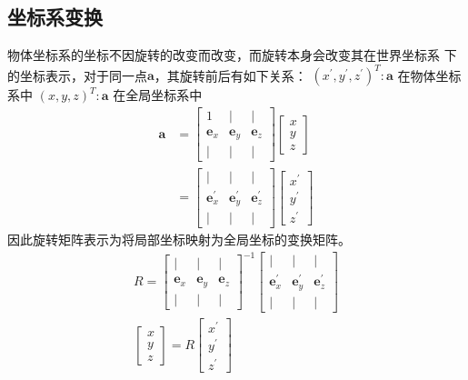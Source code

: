 \documentclass[lang=cn,newtx,10pt,scheme=chinese]{elegantbook}
\begin{document}
\subsection{坐标系变换}
物体坐标系的坐标不因旋转的改变而改变，而旋转本身会改变其在世界坐标系
下的坐标表示，对于同一点$\boldsymbol{a}$，其旋转前后有如下关系：
$\left(x^{\prime}, y^{\prime}, z^{\prime}\right)^T: 
\boldsymbol{a}$ 在物体坐标系中 $(x, y, z)^T: 
\boldsymbol{a}$ 在全局坐标系中
$$
\begin{aligned}
\boldsymbol{a} & =\left[\begin{array}{ccc}
1 & \mid & \mid \\
\boldsymbol{e}_x & \boldsymbol{e}_y & \boldsymbol{e}_z \\
\mid & \mid & \mid
\end{array}\right]\left[\begin{array}{l}
x \\
y \\
z
\end{array}\right] \\
& =\left[\begin{array}{ccc}
\mid & \mid & \mid \\
\boldsymbol{e}_x^{\prime} & \boldsymbol{e}_y^{\prime} & \boldsymbol{e}_z^{\prime} \\
\mid & \mid & \mid
\end{array}\right]\left[\begin{array}{l}
x^{\prime} \\
y^{\prime} \\
z^{\prime}
\end{array}\right]
\end{aligned}
$$
因此旋转矩阵表示为将局部坐标映射为全局坐标的变换矩阵。
\begin{equation}
  \begin{gathered}
  R=\left[\begin{array}{ccc}
  \mid & \mid & \mid \\
  \boldsymbol{e}_x & \boldsymbol{e}_y & \boldsymbol{e}_z \\
  \mid & \mid & \mid
  \end{array}\right]^{-1}\left[\begin{array}{ccc}
  \mid & \mid & \mid \\
  \boldsymbol{e}_x^{\prime} & \boldsymbol{e}_y^{\prime} & \boldsymbol{e}_z^{\prime} \\
  \mid & \mid & \mid
  \end{array}\right] \\
  {\left[\begin{array}{l}
  x \\
  y \\
  z
  \end{array}\right]=R\left[\begin{array}{l}
  x^{\prime} \\
  y^{\prime} \\
  z^{\prime}
  \end{array}\right]}
  \end{gathered}
\end{equation}
\end{document}
